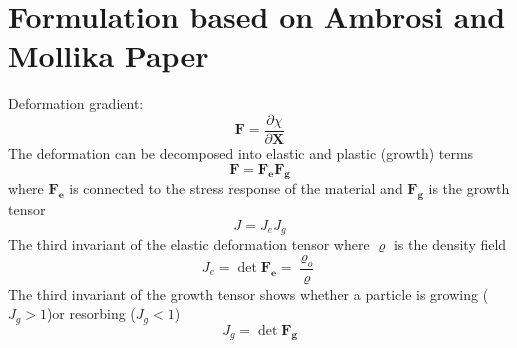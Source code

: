 \documentclass[12pt,3p]{article}
\numberwithin{equation}{section}
\begin{document}
\section{Formulation based on Ambrosi and Mollika Paper}
Deformation gradient: 
\begin{equation}\label{Deformation}
\mathbf{F}=\frac{\partial \chi}{\partial \mathbf{X}}
\end{equation}
The deformation can be decomposed into elastic and plastic (growth) terms 
\begin{equation}\label{DefMulti}
\mathbf{F} = \mathbf{F_e} \mathbf{F_g}
\end{equation}
where $\mathbf{F_e}$ is connected to the stress response of the material and $\mathbf{F_g}$ is the growth tensor 
\begin{equation}\label{JMulti}
J = J_e J_g
\end{equation}
The third invariant of the elastic deformation tensor where $\varrho$ is the density field 
\begin{equation}\label{ThirdInElastic}
J_e = \det \mathbf{F_e} = \frac{\varrho_o}{\varrho}
\end{equation}
The third invariant of the growth tensor shows whether a particle is growing ($J_g > 1$)or resorbing ($J_g < 1$)
\begin{equation}\label{ThirdInGrowth}
J_g = \det \mathbf{F_g}
\end{equation}

\end{document}
